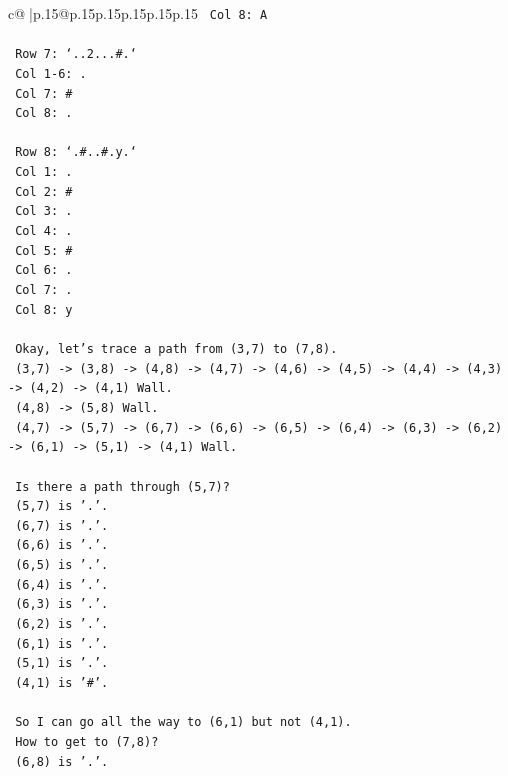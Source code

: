 \documentclass{article}
\begin{document}
{\begin{supertabular}{c@{$\;$}|p{.15\linewidth}@{}p{.15\linewidth}p{.15\linewidth}p{.15\linewidth}p{.15\linewidth}p{.15\linewidth}}
{{{\texttt{  Col 8: A} \\
\\ 
\texttt{  Row 7: `..2...\#.`} \\
\texttt{  Col 1{-}6: .} \\
\texttt{  Col 7: \#} \\
\texttt{  Col 8: .} \\
\\ 
\texttt{  Row 8: `.\#..\#.y.`} \\
\texttt{  Col 1: .} \\
\texttt{  Col 2: \#} \\
\texttt{  Col 3: .} \\
\texttt{  Col 4: .} \\
\texttt{  Col 5: \#} \\
\texttt{  Col 6: .} \\
\texttt{  Col 7: .} \\
\texttt{  Col 8: y} \\
\\ 
\texttt{  Okay, let's trace a path from (3,7) to (7,8).} \\
\texttt{  (3,7) {-}> (3,8) {-}> (4,8) {-}> (4,7) {-}> (4,6) {-}> (4,5) {-}> (4,4) {-}> (4,3) {-}> (4,2) {-}> (4,1) Wall.} \\
\texttt{  (4,8) {-}> (5,8) Wall.} \\
\texttt{  (4,7) {-}> (5,7) {-}> (6,7) {-}> (6,6) {-}> (6,5) {-}> (6,4) {-}> (6,3) {-}> (6,2) {-}> (6,1) {-}> (5,1) {-}> (4,1) Wall.} \\
\\ 
\texttt{  Is there a path through (5,7)?} \\
\texttt{  (5,7) is '.'.} \\
\texttt{  (6,7) is '.'.} \\
\texttt{  (6,6) is '.'.} \\
\texttt{  (6,5) is '.'.} \\
\texttt{  (6,4) is '.'.} \\
\texttt{  (6,3) is '.'.} \\
\texttt{  (6,2) is '.'.} \\
\texttt{  (6,1) is '.'.} \\
\texttt{  (5,1) is '.'.} \\
\texttt{  (4,1) is '\#'.} \\
\\ 
\texttt{  So I can go all the way to (6,1) but not (4,1).} \\
\texttt{  How to get to (7,8)?} \\
\texttt{  (6,8) is '.'.} \\
}}}
\end{supertabular}}
\end{document}
